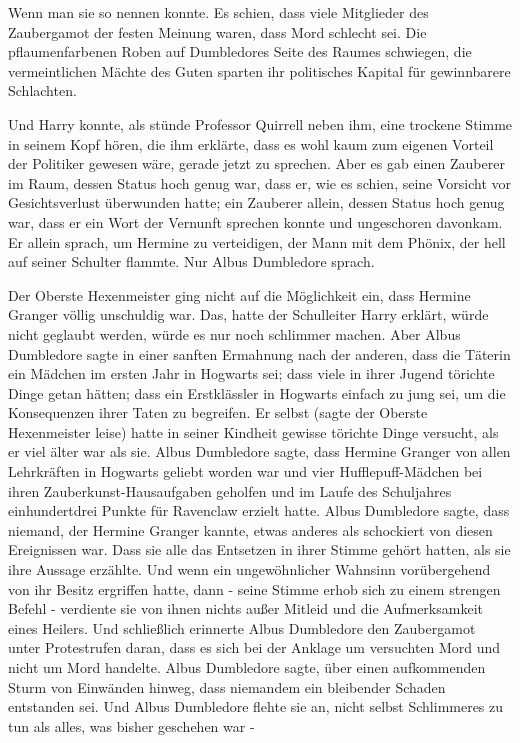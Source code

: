 Wenn man sie so nennen konnte. Es schien, dass viele Mitglieder des Zaubergamot
der festen Meinung waren, dass Mord schlecht sei. Die pflaumenfarbenen Roben auf
Dumbledores Seite des Raumes schwiegen, die vermeintlichen Mächte des Guten
sparten ihr politisches Kapital für gewinnbarere Schlachten.

Und Harry konnte, als stünde Professor Quirrell neben ihm, eine trockene Stimme
in seinem Kopf hören, die ihm erklärte, dass es wohl kaum zum eigenen Vorteil
der Politiker gewesen wäre, gerade jetzt zu sprechen. Aber es gab einen Zauberer
im Raum, dessen Status hoch genug war, dass er, wie es schien, seine Vorsicht
vor Gesichtsverlust überwunden hatte; ein Zauberer allein, dessen Status hoch
genug war, dass er ein Wort der Vernunft sprechen konnte und ungeschoren
davonkam. Er allein sprach, um Hermine zu verteidigen, der Mann mit dem Phönix,
der hell auf seiner Schulter flammte. Nur Albus Dumbledore sprach.

Der Oberste Hexenmeister ging nicht auf die Möglichkeit ein, dass Hermine
Granger völlig unschuldig war. Das, hatte der Schulleiter Harry erklärt, würde
nicht geglaubt werden, würde es nur noch schlimmer machen. Aber Albus Dumbledore
sagte in einer sanften Ermahnung nach der anderen, dass die Täterin ein Mädchen
im ersten Jahr in Hogwarts sei; dass viele in ihrer Jugend törichte Dinge getan
hätten; dass ein Erstklässler in Hogwarts einfach zu jung sei, um die
Konsequenzen ihrer Taten zu begreifen. Er selbst (sagte der Oberste Hexenmeister
leise) hatte in seiner Kindheit gewisse törichte Dinge versucht, als er viel
älter war als sie. Albus Dumbledore sagte, dass Hermine Granger von allen
Lehrkräften in Hogwarts geliebt worden war und vier Hufflepuff-Mädchen bei ihren
Zauberkunst-Hausaufgaben geholfen und im Laufe des Schuljahres einhundertdrei
Punkte für Ravenclaw erzielt hatte. Albus Dumbledore sagte, dass niemand, der
Hermine Granger kannte, etwas anderes als schockiert von diesen Ereignissen war.
Dass sie alle das Entsetzen in ihrer Stimme gehört hatten, als sie ihre Aussage
erzählte. Und wenn ein ungewöhnlicher Wahnsinn vorübergehend von ihr Besitz
ergriffen hatte, dann - seine Stimme erhob sich zu einem strengen Befehl -
verdiente sie von ihnen nichts außer Mitleid und die Aufmerksamkeit eines
Heilers. Und schließlich erinnerte Albus Dumbledore den Zaubergamot unter
Protestrufen daran, dass es sich bei der Anklage um versuchten Mord und nicht um
Mord handelte. Albus Dumbledore sagte, über einen aufkommenden Sturm von
Einwänden hinweg, dass niemandem ein bleibender Schaden entstanden sei. Und
Albus Dumbledore flehte sie an, nicht selbst Schlimmeres zu tun als alles, was
bisher geschehen war -

